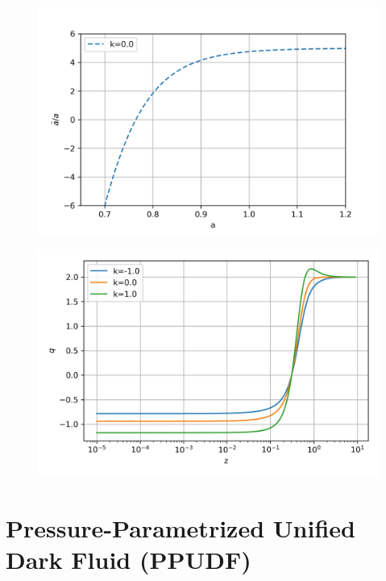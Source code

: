 \documentclass{beamer}
\begin{document}
\begin{frame}
\begin{figure}[ht]
    \begin{minipage}{0.49\linewidth}
        \centering
        \includegraphics[width=\textwidth]{./Images/ch_ddota.jpg}
		\label{fig:ch_ddot}
    \end{minipage}
    \begin{minipage}{0.49\linewidth}
        \centering
        \includegraphics[width=\textwidth]{./Images/ch_q.jpg}
		\label{fig:Chq}
    \end{minipage}
\end{figure}
\end{frame}

\section{Pressure-Parametrized Unified Dark Fluid (PPUDF)}
\end{document}
